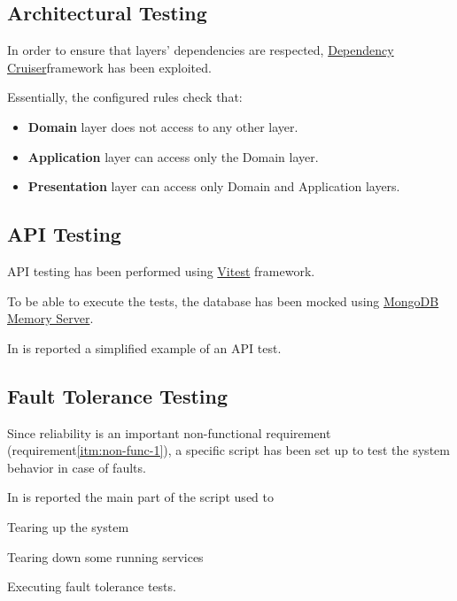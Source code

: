\documentclass{scrartcl}
\begin{document}
    \subsection{Architectural Testing}\label{subsec:architecture-testing}

    In order to ensure that layers' dependencies are respected, \href{https://github.com/sverweij/dependency-cruiser}{Dependency Cruiser}framework has been exploited.

    Essentially, the configured rules check that:

    \begin{itemize}
        \item \textbf{Domain} layer does not access to any other layer.
        \item \textbf{Application} layer can access only the Domain layer.
        \item \textbf{Presentation} layer can access only Domain and Application layers.
    \end{itemize}

    \subsection{API Testing}\label{subsec:api-testing}

    API testing has been performed using \href{https://vitest.dev/}{Vitest} framework.

    To be able to execute the tests, the database has been mocked using \href{https://github.com/nodkz/mongodb-memory-server}{MongoDB Memory Server}.

    In  is reported a simplified example of an API test.

    


    \subsection{Fault Tolerance Testing}\label{subsec:fault-tolerance-testing}

    Since reliability is an important non-functional requirement (requirement\ref{itm:non-func-1}),
    a specific script has been set up to test the system behavior in case of faults.

    In  is reported the main part of the script used to
    \begin{enumerate*}
        \item Tearing up the system
        \item Tearing down some running services
        \item Executing fault tolerance tests.
    \end{enumerate*}
\end{document}
